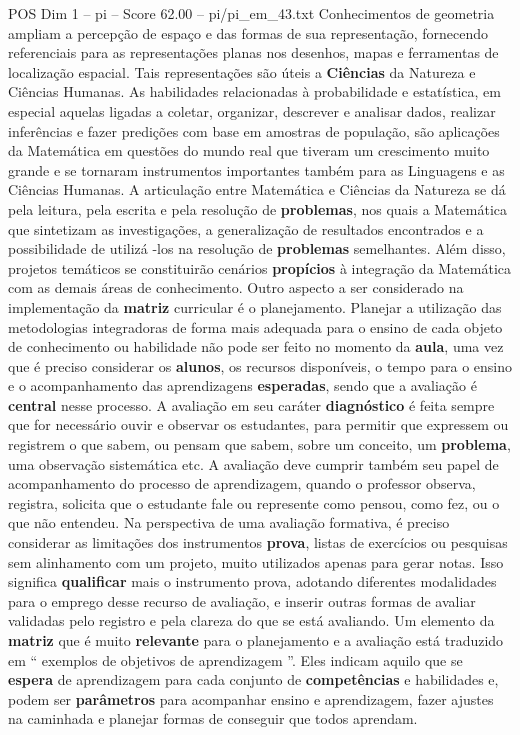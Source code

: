 \begin{textsample}{POS Dim 1 – pi – Score 62.00 – pi/pi\_em\_43.txt}
Conhecimentos de geometria ampliam a percepção de espaço e das formas de sua representação, fornecendo referenciais para as representações planas nos desenhos, mapas e ferramentas de localização espacial.
Tais representações são úteis a \textbf{Ciências} da Natureza e Ciências Humanas.
As habilidades relacionadas à probabilidade e estatística, em especial aquelas ligadas a coletar, organizar, descrever e analisar dados, realizar inferências e fazer predições com base em amostras de população, são aplicações da Matemática em questões do mundo real que tiveram um crescimento muito grande e se tornaram instrumentos importantes também para as Linguagens e as Ciências Humanas.
A articulação entre Matemática e Ciências da Natureza se dá pela leitura, pela escrita e pela resolução de \textbf{problemas}, nos quais a Matemática que sintetizam as investigações, a generalização de resultados encontrados e a possibilidade de utilizá -los na resolução de \textbf{problemas} semelhantes.
Além disso, projetos temáticos se constituirão cenários \textbf{propícios} à integração da Matemática com as demais áreas de conhecimento.
Outro aspecto a ser considerado na implementação da \textbf{matriz} curricular é o planejamento.
Planejar a utilização das metodologias integradoras de forma mais adequada para o ensino de cada objeto de conhecimento ou habilidade não pode ser feito no momento da \textbf{aula}, uma vez que é preciso considerar os \textbf{alunos}, os recursos disponíveis, o tempo para o ensino e o acompanhamento das aprendizagens \textbf{esperadas}, sendo que a avaliação é \textbf{central} nesse processo.
A avaliação em seu caráter \textbf{diagnóstico} é feita sempre que for necessário ouvir e observar os estudantes, para permitir que expressem ou registrem o que sabem, ou pensam que sabem, sobre um conceito, um \textbf{problema}, uma observação sistemática etc.
A avaliação deve cumprir também seu papel de acompanhamento do processo de aprendizagem, quando o professor observa, registra, solicita que o estudante fale ou represente como pensou, como fez, ou o que não entendeu.
Na perspectiva de uma avaliação formativa, é preciso considerar as limitações dos instrumentos \textbf{prova}, listas de exercícios ou pesquisas sem alinhamento com um projeto, muito utilizados apenas para gerar notas.
Isso significa \textbf{qualificar} mais o instrumento prova, adotando diferentes modalidades para o emprego desse recurso de avaliação, e inserir outras formas de avaliar validadas pelo registro e pela clareza do que se está avaliando.
Um elemento da \textbf{matriz} que é muito \textbf{relevante} para o planejamento e a avaliação está traduzido em “ exemplos de objetivos de aprendizagem ”.
Eles indicam aquilo que se \textbf{espera} de aprendizagem para cada conjunto de \textbf{competências} e habilidades e, podem ser \textbf{parâmetros} para acompanhar ensino e aprendizagem, fazer ajustes na caminhada e planejar formas de conseguir que todos aprendam.


\end{textsample}
